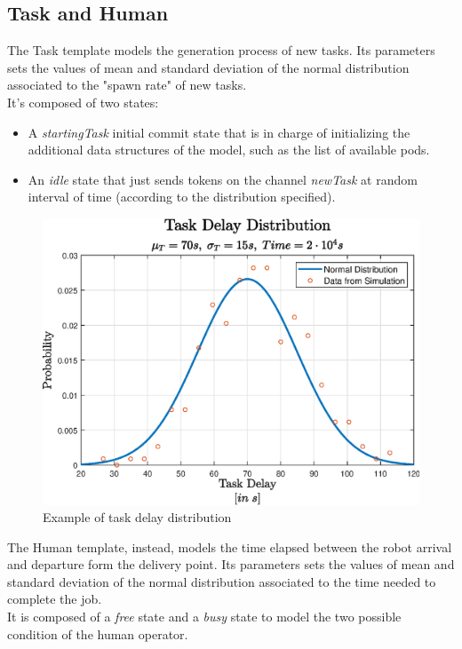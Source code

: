 \documentclass[10pt,a4paper]{article}
\begin{document}
		\subsection{Task and Human}
			The Task template models the generation process of new tasks. Its parameters sets the values of mean and standard deviation of the normal distribution associated to the "spawn rate" of new tasks.\\
			It's composed of two states:
			\begin{itemize}
				\item A \emph{startingTask} initial commit state that is in charge of initializing the additional data structures of the model, such as the list of available pods.
				\item An \emph{idle} state that just sends tokens on the channel \emph{newTask} at random interval of time (according to the distribution specified).
			\end{itemize}
			\begin{figure}[H]
				\centering
				\includegraphics[scale = 0.65]{Images/taskDelay}
				\caption{Example of task delay distribution}
			\end{figure}
			The Human template, instead, models the time elapsed between the robot arrival and departure form the delivery point. Its parameters sets the values of mean and standard deviation of the normal distribution associated to the time needed to complete the job.\\
			It is composed of a \emph{free} state and a \emph{busy} state to model the two possible condition of the human operator. 
			
\end{document}
